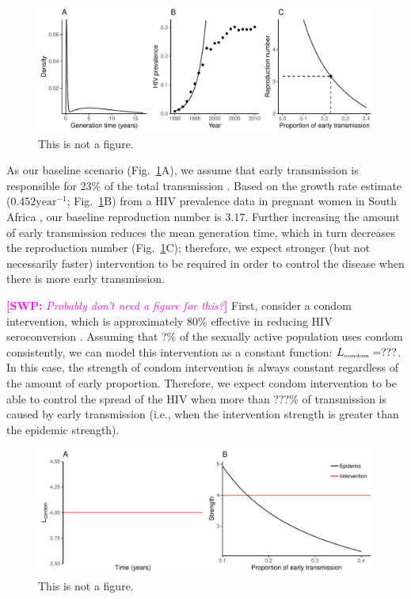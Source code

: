 \documentclass{article}\usepackage[]{graphicx}\usepackage[]{color}
\newcommand{\comment}[3]{\textcolor{#1}{\textbf{[#2: }\textit{#3}\textbf{]}}}
\newcommand{\swp}[1]{\comment{magenta}{SWP}{#1}}
\newcommand{\tsub}[2]{#1_{{\textrm{\tiny #2}}}}
\newcommand{\figref}[1]{Fig.~\ref{fig:#1}}
\newcommand{\figlab}[1]{\label{fig:#1}}
\begin{document}
\begin{figure}[!t]
\includegraphics[width=\textwidth]{../figure/figure1.pdf}
\caption{This is not a figure.}
\figlab{example}
\end{figure}

As our baseline scenario (\figref{example}A), we assume that early transmission is responsible for 23\% of the total transmission \citep{hayes2006amplified}.
Based on the growth rate estimate ($0.452 \textrm{year}^{-1}$; \figref{example}B) from a HIV prevalence data in pregnant women in South Africa \citep{barron2013eliminating}, our baseline reproduction number is $3.17$.
Further increasing the amount of early transmission reduces the mean generation time, which in turn decreases the reproduction number (\figref{example}C);
therefore, we expect stronger (but not necessarily faster) intervention to be required in order to control the disease when there is more early transmission.

\swp{Probably don't need a figure for this?}
First, consider a condom intervention, which is approximately 80\% effective in reducing HIV seroconversion \citep{weller2002condom}.
Assuming that ?\% of the sexually active population uses condom consistently,
we can model this intervention as a constant function: $\tsub{L}{condom} = ???$.
In this case, the strength of condom intervention is always constant regardless of the amount of early proportion.
Therefore, we expect condom intervention to be able to control the spread of the HIV when more than ???\% of transmission is caused by early transmission (i.e., when the intervention strength is greater than the epidemic strength).

\begin{figure}[!t]
\includegraphics[width=\textwidth]{../figure/figure2.pdf}
\caption{This is not a figure.}
\figlab{test}
\end{figure}
\end{document}
